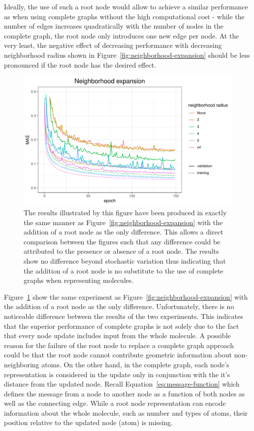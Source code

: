 Ideally, the use of such a root node would allow to achieve a similar performance as when using complete graphs without the high computational cost - while the number of edges increases quadratically with the number of nodes in the complete graph, the root node only introduces one new edge per node. At the very least, the negative effect of decreasing performance with decreasing neighborhood radius shown in Figure~\ref{fig:neighborhood-expansion} should be less pronounced if the root node has the desired effect.

\begin{figure}[H]
	\includegraphics[width=\linewidth]{figures/neighborhood-expansion-root-weight}
	\caption{The results illustrated by this figure have been produced in exactly the same manner as Figure~\ref{fig:neighborhood-expansion} with the addition of a root node as the only difference. This allows a direct comparison between the figures such that any difference could be attributed to the presence or absence of a root node. The results show no difference beyond stochastic variation thus indicating that the addition of a root node is no substitute to the use of complete graphs when representing molecules.}
	\label{fig:neighborhood-expansion-root-weight}
\end{figure}

Figure~\ref{fig:neighborhood-expansion-root-weight} show the same experiment as Figure~\ref{fig:neighborhood-expansion} with the addition of a root node as the only difference. Unfortunately, there is no noticeable difference between the results of the two experiments. This indicates that the superior performance of complete graphs is not solely due to the fact that every node update includes input from the whole molecule. A possible reason for the failure of the root node to replace a complete graph approach could be that the root node cannot contribute geometric information about non-neighboring atoms. On the other hand, in the complete graph, each node's representation is considered in the update only in conjunction with the it's distance from the updated node. Recall Equation~\ref{eq:message-function} which defines the message from a node to another node as a function of both nodes as well as the connecting edge. While a root node representation can encode information about the whole molecule, such as number and types of atoms, their position relative to the updated node (atom) is missing.


